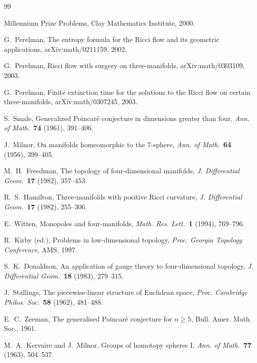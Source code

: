\documentclass[12pt]{article}
\theoremstyle{plain}
\theoremstyle{definition}
\begin{document}

\begin{thebibliography}{99}

Millennium Prize Problems, Clay Mathematics Institute, 2000.

G.~Perelman,
The entropy formula for the Ricci flow and its geometric applications,
arXiv:math/0211159, 2002.

G.~Perelman,
Ricci flow with surgery on three-manifolds,
arXiv:math/0303109, 2003.

G.~Perelman,
Finite extinction time for the solutions to the Ricci flow on certain
three-manifolds,
arXiv:math/0307245, 2003.

S.~Smale,
Generalized Poincar\'e conjecture in dimensions greater than four,
\emph{Ann. of Math.}\ \textbf{74} (1961), 391--406.

J.~Milnor,
On manifolds homeomorphic to the 7-sphere,
\emph{Ann. of Math.}\ \textbf{64} (1956), 399--405.

M.~H.~Freedman,
The topology of four-dimensional manifolds,
\emph{J. Differential Geom.}\ \textbf{17} (1982), 357--453.

R.~S.~Hamilton,
Three-manifolds with positive Ricci curvature,
\emph{J. Differential Geom.}\ \textbf{17} (1982), 255--306.

E.~Witten,
Monopoles and four-manifolds,
\emph{Math. Res. Lett.}\ \textbf{1} (1994), 769--796.

R.~Kirby (ed.),
Problems in low-dimensional topology,
\emph{Proc. Georgia Topology Conference}, AMS, 1997.

S.~K.~Donaldson,
An application of gauge theory to four-dimensional topology,
\emph{J. Differential Geom.}\ \textbf{18} (1983), 279--315.

J.~Stallings,
The piecewise-linear structure of Euclidean space,
\emph{Proc. Cambridge Philos. Soc.}\ \textbf{58} (1962), 481--488.

E.~C.~Zeeman,
The generalised Poincar\'e conjecture for $n\geq5$,
Bull. Amer. Math. Soc., 1961.

M.~A.~Kervaire and J.~Milnor,
Groups of homotopy spheres I,
\emph{Ann. of Math.}\ \textbf{77} (1963), 504--537.


\end{thebibliography}
\end{document}
